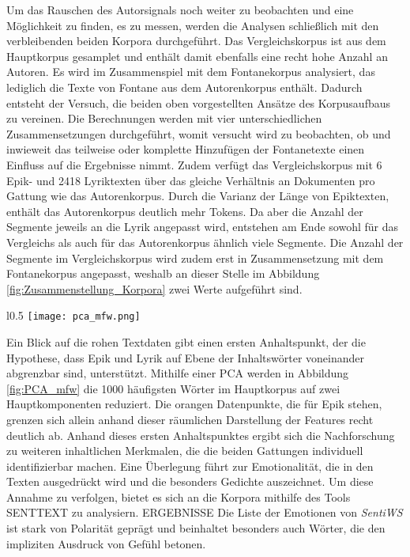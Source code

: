 \documentclass[a4paper,10p]{article}
\begin{document}
Um das Rauschen des Autorsignals noch weiter zu beobachten und eine Möglichkeit zu finden, es zu messen, werden die Analysen schließlich mit den verbleibenden beiden Korpora durchgeführt. Das Vergleichskorpus ist aus dem Hauptkorpus gesamplet und enthält damit ebenfalls eine recht hohe Anzahl an Autoren. Es wird im Zusammenspiel mit dem Fontanekorpus analysiert, das lediglich die Texte von Fontane aus dem Autorenkorpus enthält. Dadurch entsteht der Versuch, die beiden oben vorgestellten Ansätze des Korpusaufbaus zu vereinen. Die Berechnungen werden mit vier unterschiedlichen Zusammensetzungen durchgeführt, womit versucht wird zu beobachten, ob und inwieweit das teilweise oder komplette Hinzufügen der Fontanetexte einen Einfluss auf die Ergebnisse nimmt. Zudem verfügt das Vergleichskorpus mit 6 Epik- und 2418 Lyriktexten über das gleiche Verhältnis an Dokumenten pro Gattung wie das Autorenkorpus. Durch die Varianz der Länge von Epiktexten, enthält das Autorenkorpus deutlich mehr Tokens. Da aber die Anzahl der Segmente jeweils an die Lyrik angepasst wird, entstehen am Ende sowohl für das Vergleichs als auch für das Autorenkorpus ähnlich viele Segmente. Die Anzahl der Segmente im Vergleichskorpus wird zudem erst in Zusammensetzung mit dem Fontanekorpus angepasst, weshalb an dieser Stelle im Abbildung \ref{fig:Zusammenstellung_Korpora} zwei Werte aufgeführt sind. \par

\begin{wrapfigure}{l}{0.5\textwidth}
	\texttt{[image: pca\_mfw.png]}
	\caption{PCA mit den 1000 most frequent words des Hauptkorpus}
	\label{fig:PCA_mfw}
\end{wrapfigure}

Ein Blick auf die rohen Textdaten gibt einen ersten Anhaltspunkt, der die Hypothese, dass Epik und Lyrik auf Ebene der Inhaltswörter voneinander abgrenzbar sind, unterstützt. Mithilfe einer PCA werden in Abbildung \ref{fig:PCA_mfw} die 1000 häufigsten Wörter im Hauptkorpus auf zwei Hauptkomponenten reduziert. Die orangen Datenpunkte, die für Epik stehen, grenzen sich allein anhand dieser räumlichen Darstellung der Features recht deutlich ab. Anhand dieses ersten Anhaltspunktes ergibt sich die Nachforschung zu weiteren inhaltlichen Merkmalen, die die beiden Gattungen individuell identifizierbar machen. Eine Überlegung führt zur Emotionalität, die in den Texten ausgedrückt wird und die besonders Gedichte auszeichnet. Um diese Annahme zu verfolgen, bietet es sich an die Korpora mithilfe des Tools SENTTEXT zu analysiern. ERGEBNISSE Die Liste der Emotionen von \textit{SentiWS} \citep{Sentiws} ist stark von Polarität geprägt und beinhaltet besonders auch Wörter, die den impliziten Ausdruck von Gefühl betonen. \par 
\end{document}

